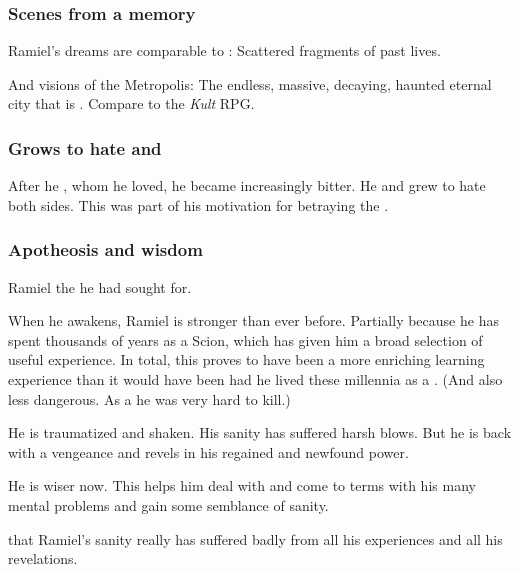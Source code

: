 \subsubsection{Scenes from a memory}
Ramiel's dreams are comparable to \cite{DreamTheater:ScenesfromaMemory}: Scattered fragments of past lives. 

And visions of the Metropolis: The endless, massive, decaying, haunted eternal city that is \Nyx. Compare to the \emph{Kult} RPG. 





\subsubsection{Grows to hate \dragons{} and \banes}
After he , whom he loved, he became increasingly bitter. 
He  and grew to hate both sides. 
This was part of his motivation for betraying the \banelords. 





\subsubsection{Apotheosis and wisdom}
Ramiel  the  he had sought for. 

When he awakens, Ramiel is stronger than ever before. 
Partially because he has spent thousands of years  as a Scion, which has given him a broad selection of useful experience. 
In total, this proves to have been a more enriching learning experience than it would have been had he lived these millennia as a \resphan. 
(And also less dangerous.
As a \malach he was very hard to kill.)

He is traumatized and shaken. 
His sanity has suffered harsh blows.
But he is back with a vengeance and revels in his regained and newfound power.

He is wiser now. 
This helps him deal with and come to terms with his many mental problems and gain some semblance of sanity. 

 that Ramiel's sanity really has suffered badly from all his experiences and all his revelations.

